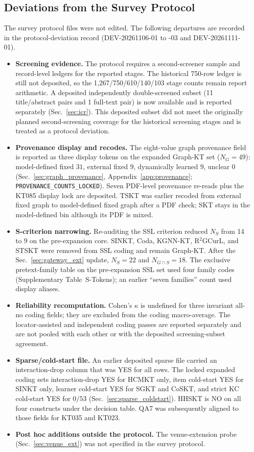 \documentclass[lettersize,journal]{IEEEtran}
\begin{document}
\subsection{Deviations from the Survey Protocol}
\label{sec:deviations}
The survey protocol files were not edited. The following departures are recorded in the protocol-deviation record (DEV-20261106-01 to -03 and DEV-20261111-01).
\begin{itemize}
    \item \textbf{Screening evidence.} The protocol requires a second-screener sample and record-level ledgers for the reported stages. The historical 750-row ledger is still not deposited, so the 1{,}267/750/610/140/103 stage counts remain report arithmetic. A deposited independently double-screened subset (11 title/abstract pairs and 1 full-text pair) is now available and is reported separately (Sec.~\ref{sec:icr}). This deposited subset did not meet the originally planned second-screening coverage for the historical screening stages and is treated as a protocol deviation.
    \item \textbf{Provenance display and recodes.} The eight-value graph provenance field is reported as three display tokens on the expanded Graph-KT set ($N_G=49$): model-defined fixed $31$, external fixed $9$, dynamically learned $9$, unclear $0$ (Sec.~\ref{sec:graph_provenance}, Appendix~\ref{app:provenance}; \texttt{PROVENANCE\_COUNTS\_LOCKED}). Seven PDF-level provenance re-reads plus the KT085 display lock are deposited. TSKT was earlier recoded from external fixed graph to model-defined fixed graph after a PDF check; SKT stays in the model-defined bin although its PDF is mixed.
    \item \textbf{S-criterion narrowing.} Re-auditing the SSL criterion reduced $N_S$ from 14 to 9 on the pre-expansion core. SINKT, Coda, KGNN-KT, R$^2$GCurL, and STSKT were removed from SSL coding and remain Graph-KT. After the Sec.~\ref{sec:gateway_ext} update, $N_S=22$ and $N_{G\cap S}=18$. The exclusive pretext-family table on the pre-expansion SSL set used four family codes (Supplementary Table~S-Tokens); an earlier ``seven families'' count used display aliases.
    \item \textbf{Reliability recomputation.} Cohen's $\kappa$ is undefined for three invariant all-no coding fields; they are excluded from the coding macro-average. The locator-assisted and independent coding passes are reported separately and are not pooled with each other or with the deposited screening-subset agreement.
    \item \textbf{Sparse/cold-start file.} An earlier deposited sparse file carried an interaction-drop column that was YES for all rows. The locked expanded coding sets interaction-drop YES for HCMKT only, item cold-start YES for SINKT only, learner cold-start YES for SGKT and CoSKT, and strict KC cold-start YES for $0/53$ (Sec.~\ref{sec:sparse_coldstart}). HHSKT is NO on all four constructs under the decision table. QA7 was subsequently aligned to those fields for KT035 and KT023.
    \item \textbf{Post hoc additions outside the protocol.} The venue-extension probe (Sec.~\ref{sec:venue_ext}) was not specified in the survey protocol.
\end{itemize}
\end{document}
